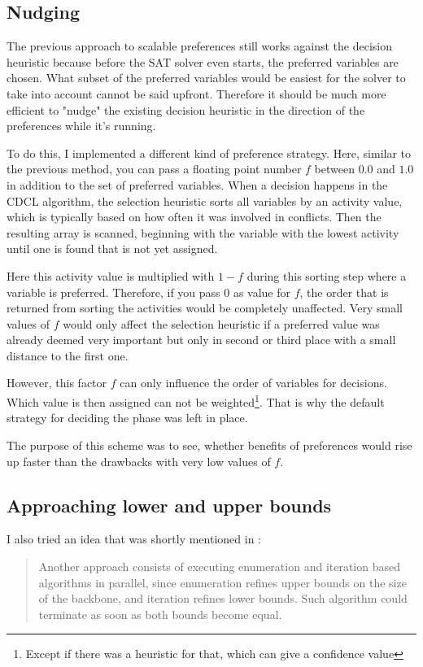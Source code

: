\subsection{Nudging}
\label{sec:nudging}
The previous approach to scalable preferences still works against the decision heuristic because before the SAT solver even starts, the preferred variables are chosen. What subset of the preferred variables would be easiest for the solver to take into account cannot be said upfront. Therefore it should be much more efficient to "nudge" the existing decision heuristic in the direction of the preferences while it's running.

To do this, I implemented a different kind of preference strategy. Here, similar to the previous method, you can pass a floating point number $f$ between $0.0$ and $1.0$ in addition to the set of preferred variables. When a decision happens in the CDCL algorithm, the selection heuristic sorts all variables by an activity value, which is typically based on how often it was involved in conflicts. Then the resulting array is scanned, beginning with the variable with the lowest activity until one is found that is not yet assigned. 

Here this activity value is multiplied with $1-f$ during this sorting step where a variable is preferred. Therefore, if you pass $0$ as value for $f$, the order that is returned from sorting the activities would be completely unaffected. Very small values of $f$ would only affect the selection heuristic if a preferred value was already deemed very important but only in second or third place with a small distance to the first one. 

However, this factor $f$ can only influence the order of variables for decisions. Which value is then assigned can not be weighted\footnote{Except if there was a heuristic for that, which can give a confidence value}. That is why the default strategy for deciding the phase was left in place. 


The purpose of this scheme was to see, whether benefits of preferences would rise up faster than the drawbacks with very low values of $f$.

\subsection{Approaching lower and upper bounds}
\label{sec:upperLower}
I also tried an idea that was shortly mentioned in \cite[Chapter 3.4]{mjl10}: \blockquote{Another approach consists of executing enumeration and iteration based algorithms in parallel, since enumeration refines upper bounds on the size of the backbone, and iteration refines lower bounds. Such algorithm could terminate as soon as both bounds become equal.}

